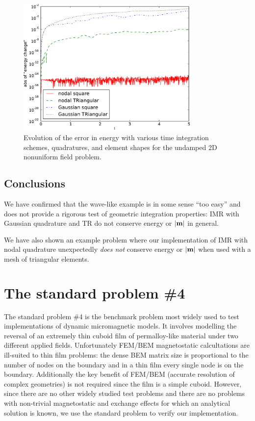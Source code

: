 \begin{figure}
  \centering
  \includegraphics[width=0.8\textwidth]
  {plots/nonuniform-h-triangles-energy-error/absofenergychangevstimes.pdf}
  \caption{
    Evolution of the error in energy
    with various time integration schemes, quadratures, and element shapes
    for the undamped 2D nonuniform field problem.
  }
  \label{fig:energy-error-triangle-mesh}
\end{figure}

\subsection{Conclusions}

We have confirmed that the wave-like example is in some sense ``too easy'' and does not provide a rigorous test of geometric integration properties: IMR with Gaussian quadrature and TR do not conserve energy or $\left|{\boldsymbol{\mathrm{m}}} \right|$ in general.

We have also shown an example problem where our implementation of IMR with nodal quadrature unexpectedly \emph{does not} conserve energy or $\left|{\boldsymbol{\mathrm{m}}} \right|$ when used with a mesh of triangular elements.


\FloatBarrier
\section{The \mumag standard problem \#4}
\label{sec:mumag-stand-probl}

The \mumag standard problem \#4 \cite{mumag-website} is the benchmark problem most widely used to test implementations of dynamic micromagnetic models.
It involves modelling the reversal of an extremely thin cuboid film of permalloy-like material under two different applied fields.
Unfortunately FEM/BEM magnetostatic calcultations are ill-suited to thin film problems: the dense BEM matrix size is proportional to the number of nodes on the boundary and in a thin film every single node is on the boundary.
Additionally the key benefit of FEM/BEM (accurate resolution of complex geometries) is not required since the film is a simple cuboid.
However, since there are no other widely studied test problems and there are no problems with non-trivial magnetostatic and exchange effects for which an analytical solution is known, we use the standard problem to verify our implementation.


